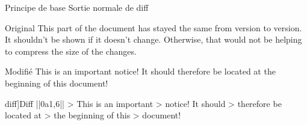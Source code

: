 \documentclass[10pt,xcolor={dvipsnames}]{beamer}
\begin{document}
\begin{frame}[fragile]{Principe de base}
Sortie normale de diff

\begin{tcbraster}[raster columns=3, raster valign=top]
      \begin{snvlisting}{Original}
This part of the
document has stayed the
same from version to
version.  It shouldn't
be shown if it doesn't
change.  Otherwise, that
would not be helping to
compress the size of the
changes.
      \end{snvlisting}
      \begin{snvlisting}{Modifié}
This is an important
notice! It should
therefore be located at
the beginning of this
document!
      \end{snvlisting}
      \begin{tcolorbox}[blanker]
      \begin{tcbraster}[raster columns=1, raster rows=2]
      \begin{snvlisting}[[normal]diff]{Diff}
||0a1,6||
> This is an important
> notice! It should
> therefore be located at
> the beginning of this
> document!
      \end{snvlisting}
      \
      \end{tcbraster}
      \end{tcolorbox}
\end{tcbraster}
\end{frame}
\end{document}
